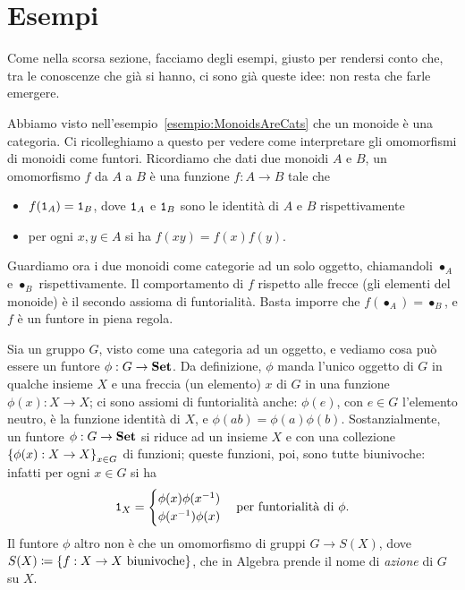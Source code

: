 
\section{Esempi}

Come nella scorsa sezione, facciamo degli esempi, giusto per rendersi conto che, tra le conoscenze che già si hanno, ci sono già queste idee: non resta che farle emergere.

\begin{esempio}
Abbiamo visto nell'esempio~\ref{esempio:MonoidsAreCats} che un monoide è una categoria. Ci ricolleghiamo a questo per vedere come interpretare gli omomorfismi di monoidi come funtori.\newline
Ricordiamo che dati due monoidi \(A\) e \(B\), un omomorfismo \(f\) da \(A\) a \(B\) è una funzione \(f : A \to B\) tale che
\begin{itemize}
\item \(f(\mathtt{1}_A) = \mathtt{1}_B\), dove \(\mathtt{1}_A\) e \(\mathtt{1}_B\) sono le identità di \(A\) e \(B\) rispettivamente
\item per ogni \(x, y \in A\) si ha \(f(xy) = f(x)f(y)\).
\end{itemize}
Guardiamo ora i due monoidi come categorie ad un solo oggetto, chiamandoli \(\bullet_A\) e \(\bullet_B\) rispettivamente. Il comportamento di \(f\) rispetto alle frecce (gli elementi del monoide) è il secondo assioma di funtorialità. Basta imporre che \(f(\bullet_A) = \bullet_B\), e \(f\) è un funtore in piena regola.
\end{esempio}


\begin{esempio}
Sia un gruppo \(G\), visto come una categoria ad un oggetto, e vediamo cosa può essere un funtore \(\phi : G \to \mathbf{Set}\). Da definizione, \(\phi\) manda l'unico oggetto di \(G\) in qualche insieme \(X\) e una freccia (un elemento) \(x\) di \(G\) in una funzione \(\phi(x) : X \to X\); ci sono assiomi di funtorialità anche: \(\phi(e)\), con \(e \in G\) l'elemento neutro, è la funzione identità di \(X\), e \(\phi(ab) = \phi(a)\phi(b)\). Sostanzialmente, un funtore \(\phi : G \to \mathbf{Set}\) si riduce ad un insieme \(X\) e con una collezione \(\left\{\phi(x) : X \to X\right\}_{x \in G}\) di funzioni; queste funzioni, poi, sono tutte biunivoche: infatti per ogni \(x \in G\) si ha 
\[\mathtt{1}_X = \begin{cases} \phi(x)\phi(x^{-1}) \\ \phi(x^{-1})\phi(x) \end{cases} \text{per funtorialità di } \phi .\]
Il funtore \(\phi\) altro non è che un omomorfismo di gruppi \(G \to S(X)\), dove \(S(X) \coloneq \left\{f : X \to X \text{ biunivoche}\right\}\), che in Algebra prende il nome di {\em azione} di \(G\) su \(X\).
\end{esempio}

